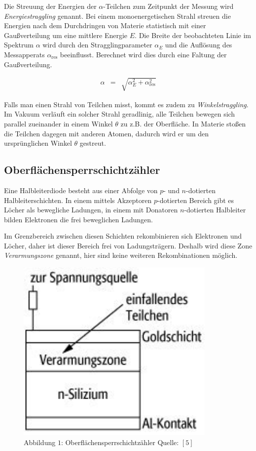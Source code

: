 \documentclass[12pt,a4paper]{scrartcl}
\numberwithin{equation}{section} %
\renewcommand{\[}{} %
\renewcommand{\]}{\noindent} %
\begin{document}
Die Streuung der Energien der \(\alpha\)-Teilchen zum Zeitpunkt der
Messung wird \emph{Energiestraggling} genannt. Bei einem
monoenergetischen Strahl streuen die Energien nach dem Durchdringen von
Materie statistisch mit einer Gaußverteilung um eine mittlere Energie
\(E\). Die Breite der beobachteten Linie im Spektrum \(\alpha\) wird
durch den Stragglingparameter \(\alpha_E\) und die Auflösung des
Messapperats \(\alpha_\mathrm{res}\) beeinflusst. Berechnet wird dies
durch eine Faltung der Gaußverteilung.

\[
\begin{eqnarray}
    \alpha &=& \sqrt{\alpha_E^2 + \alpha_\mathrm{res}^2}
\end{eqnarray}
\]

Falls man einen Strahl von Teilchen misst, kommt es zudem zu
\emph{Winkelstraggling}. Im Vakuum verläuft ein solcher Strahl
geradlinig, alle Teilchen bewegen sich parallel zueinander in einem
Winkel \(\theta\) zu z.B. der Oberfläche. In Materie stoßen die Teilchen
dagegen mit anderen Atomen, dadurch wird er um den ursprünglichen Winkel
\(\theta\) gestreut.

\hypertarget{oberfluxe4chensperrschichtzuxe4hler}{%
\subsection{Oberflächensperrschichtzähler}\label{oberfluxe4chensperrschichtzuxe4hler}}

Eine Halbleiterdiode besteht aus einer Abfolge von \(p\)- und
\(n\)-dotierten Halbleiterschichten. In einem mittels Akzeptoren
\(p\)-dotierten Bereich gibt es Löcher als bewegliche Ladungen, in einem
mit Donatoren \(n\)-dotierten Halbleiter bilden Elektronen die frei
beweglichen Ladungen.

Im Grenzbereich zwischen diesen Schichten rekombinieren sich Elektronen
und Löcher, daher ist dieser Bereich frei von Ladungsträgern. Deshalb
wird diese Zone \emph{Verarmungszone} genannt, hier sind keine weiteren
Rekombinationen möglich.

\begin{figure}
	\centering
	\includegraphics{../media/B3.3/Oberflaechensperrschichtzaehler.pdf}
	\caption{Abbildung \(1\): Oberflächensperrschichtzähler Quelle: \([5]\)}
\end{figure}
\end{document}

